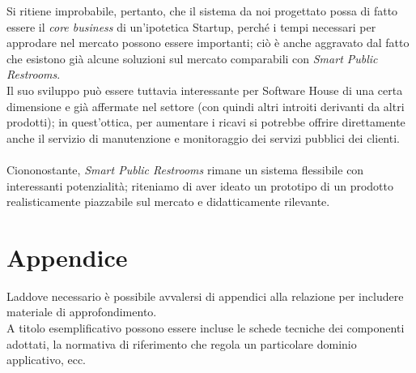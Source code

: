 \documentclass[12pt]{article}
\begin{document}
Si ritiene improbabile, pertanto, che il sistema da noi progettato possa di fatto essere il \textit{core business} di un'ipotetica Startup, perché i tempi necessari per approdare nel mercato possono essere importanti; ciò è anche aggravato dal fatto che esistono già alcune soluzioni sul mercato comparabili con \textit{Smart Public Restrooms}.\\
Il suo sviluppo può essere tuttavia interessante per Software House di una certa dimensione e già affermate nel settore (con quindi altri introiti derivanti da altri prodotti); in quest'ottica, per aumentare i ricavi si potrebbe offrire direttamente anche il servizio di manutenzione e monitoraggio dei servizi pubblici dei clienti.\\\\
Ciononostante, \textit{Smart Public Restrooms} rimane un sistema flessibile con interessanti potenzialità; riteniamo di aver ideato un prototipo di un prodotto realisticamente piazzabile sul mercato e didatticamente rilevante.
\newpage



\appendix
{}
\section*{Appendice}
Laddove necessario è possibile avvalersi di appendici alla relazione per includere materiale di approfondimento.\\

A titolo esemplificativo possono essere incluse le schede tecniche dei componenti adottati, la normativa di riferimento che regola un particolare dominio applicativo, ecc.


\newpage
\end{document}
